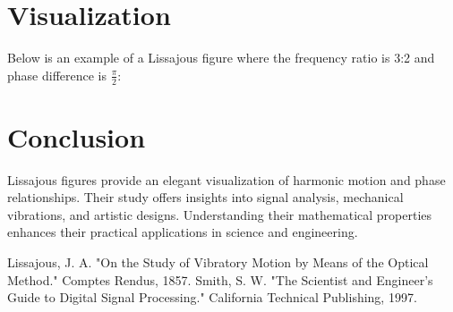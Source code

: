 \documentclass{article}
\begin{document}
\section{Visualization}
Below is an example of a Lissajous figure where the frequency ratio is 3:2 and phase difference is $\frac{\pi}{2}$:

\section{Conclusion}
Lissajous figures provide an elegant visualization of harmonic motion and phase relationships. Their study offers insights into signal analysis, mechanical vibrations, and artistic designs. Understanding their mathematical properties enhances their practical applications in science and engineering.

\begin{thebibliography}{9}
 Lissajous, J. A. "On the Study of Vibratory Motion by Means of the Optical Method." Comptes Rendus, 1857.
 Smith, S. W. "The Scientist and Engineer's Guide to Digital Signal Processing." California Technical Publishing, 1997.
\end{thebibliography}
\end{document}
